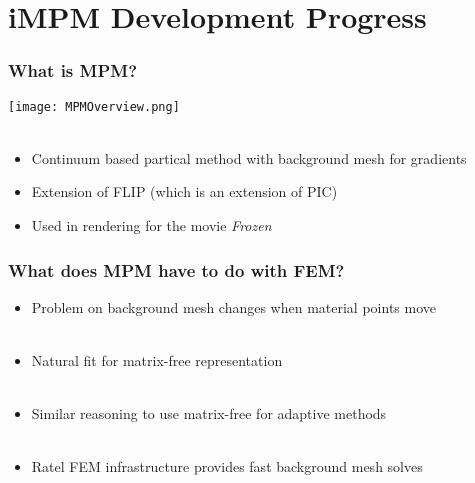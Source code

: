 \documentclass{beamer}
\begin{document}
\section{iMPM Development Progress}

\begin{frame}
\begin{center}
\frametitle{What is MPM?}

\texttt{[image: MPMOverview.png]}\\

~\\

\begin{itemize}

\item Continuum based partical method with background mesh for gradients\\

\item Extension of FLIP (which is an extension of PIC)\\

\item Used in rendering for the movie \emph{Frozen}\\

\end{itemize}

\end{center}
\end{frame}


\begin{frame}
\begin{center}
\frametitle{What does MPM have to do with FEM?}

\begin{itemize}

\item Problem on background mesh changes when material points move\\

~\\

\item Natural fit for matrix-free representation\\

~\\

\item Similar reasoning to use matrix-free for adaptive methods\\

~\\

\item Ratel FEM infrastructure provides fast background mesh solves\\

\end{itemize}

\end{center}
\end{frame}
\end{document}
